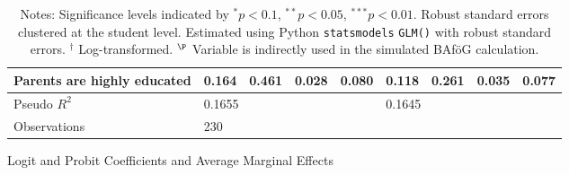 \begin{table}
\begin{tabular}{lllllllll}
Parents are highly educated & 0.164 & 0.461 & 0.028 & 0.080 & 0.118 & 0.261 & 0.035 & 0.077 \\
\midrule
Pseudo $R^2$ & \multicolumn{4}{l}{0.1655} & \multicolumn{4}{l}{0.1645} \\
Observations & \multicolumn{8}{l}{230} \\
\bottomrule
\end{tabular}
\caption{Logit and Probit Coefficients and Average Marginal Effects}
\label{tab:logit_probit_results}
\caption*{\small{Notes: Significance levels indicated by $^{*} p < 0.1$, $^{**} p < 0.05$, $^{***} p < 0.01$. Robust standard errors clustered at the student level. Estimated using Python \texttt{statsmodels} \texttt{GLM()} with robust standard errors. $^\dagger$ Log-transformed. $^\P$ Variable is indirectly used in the simulated BAföG calculation.}}\end{table}
